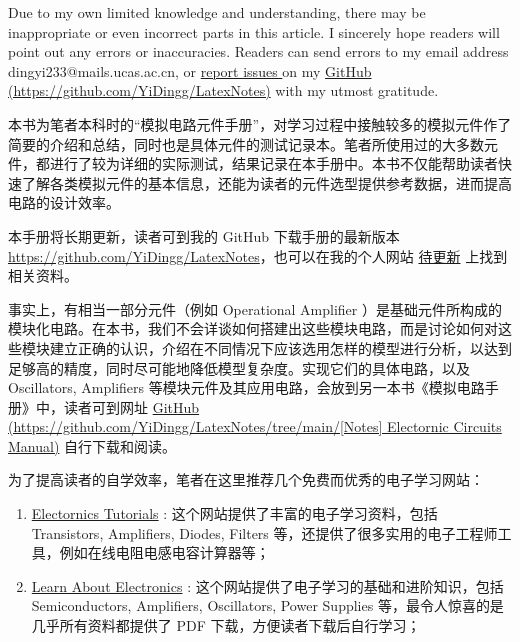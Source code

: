 \documentclass[UTF8]{report}
\begin{document}
\begin{enabstract}
    Due to my own limited knowledge and understanding, there may be inappropriate or even incorrect parts in this article. I sincerely hope readers will point out any errors or inaccuracies. Readers can send errors to my email address {\color{blue} dingyi233@mails.ucas.ac.cn}, or %
    \href{https://github.com/YiDingg/LatexNotes/issues
    }{ %
    report issues
    } on my \href{https://github.com/YiDingg/LatexNotes}{GitHub {\color{black} (https://github.com/YiDingg/LatexNotes)}} with my utmost gratitude.
\end{enabstract}




\newpage
\begin{cnabstract}\normalsize 
本书为笔者本科时的“模拟电路元件手册”，对学习过程中接触较多的模拟元件作了简要的介绍和总结，同时也是具体元件的测试记录本。笔者所使用过的大多数元件，都进行了较为详细的实际测试，结果记录在本手册中。本书不仅能帮助读者快速了解各类模拟元件的基本信息，还能为读者的元件选型提供参考数据，进而提高电路的设计效率。

本手册将长期更新，读者可到我的 GitHub 下载手册的最新版本 \href{https://github.com/YiDingg/LatexNotes}{https://github.com/YiDingg/LatexNotes}，也可以在我的个人网站 \href{URL}{待更新} 上找到相关资料。

事实上，有相当一部分元件（例如 Operational Amplifier ）是基础元件所构成的模块化电路。在本书，我们不会详谈如何搭建出这些模块电路，而是讨论如何对这些模块建立正确的认识，介绍在不同情况下应该选用怎样的模型进行分析，以达到足够高的精度，同时尽可能地降低模型复杂度。实现它们的具体电路，以及 Oscillators, Amplifiers 等模块元件及其应用电路，会放到另一本书{\kaishu 《模拟电路手册》}中，读者可到网址 \href{https://github.com/YiDingg/LatexNotes/tree/main/%5BNotes%5D%20Electornic%20Circuits%20Manual}{GitHub {\color{black} (https://github.com/YiDingg/LatexNotes/tree/main/[Notes] Electornic Circuits Manual)}} 自行下载和阅读。


为了提高读者的自学效率，笔者在这里推荐几个免费而优秀的电子学习网站：
\begin{enumerate}
\item \href{https://www.electronics-tutorials.ws/}{Electornics Tutorials} : 这个网站提供了丰富的电子学习资料，包括 Transistors, Amplifiers, Diodes, Filters 等，还提供了很多实用的电子工程师工具，例如在线电阻电感电容计算器等；

\item \href{https://www.learnabout-electronics.org/}{Learn About Electronics} : 这个网站提供了电子学习的基础和进阶知识，包括 Semiconductors, Amplifiers, Oscillators, Power Supplies 等，最令人惊喜的是几乎所有资料都提供了 PDF 下载，方便读者下载后自行学习；


\end{enumerate}
\end{cnabstract}
\end{document}
